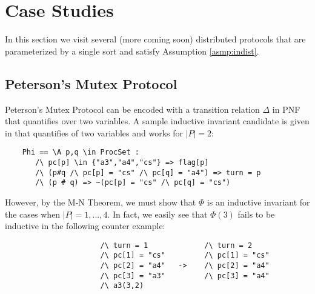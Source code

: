 \documentclass[12pt]{article}
\theoremstyle{definition}
\theoremstyle{remark}
\begin{document}
\section{Case Studies}
In this section we visit several (more coming soon) distributed protocols that are parameterized by a single sort and satisfy Assumption \ref{asmp:indist}.

\subsection{Peterson's Mutex Protocol}
Peterson's Mutex Protocol can be encoded with a transition relation $\Delta$ in PNF that quantifies over two variables.  A sample inductive invariant candidate is given in \cite{ian-peterson} that quantifies of two variables and works for $|P|=2$:
\begin{verbatim}
    Phi == \A p,q \in ProcSet :
       /\ pc[p] \in {"a3","a4","cs"} => flag[p]
       /\ (p#q /\ pc[p] = "cs" /\ pc[q] = "a4") => turn = p
       /\ (p # q) => ~(pc[p] = "cs" /\ pc[q] = "cs")
\end{verbatim}
However, by the M-N Theorem, we must show that $\Phi$ is an inductive invariant for the cases when $|P|=1,...,4$.  In fact, we easily see that $\Phi(3)$ fails to be inductive in the following counter example:
\begin{verbatim}
                      /\ turn = 1             /\ turn = 2
                      /\ pc[1] = "cs"         /\ pc[1] = "cs"
                      /\ pc[2] = "a4"   ->    /\ pc[2] = "a4"
                      /\ pc[3] = "a3"         /\ pc[3] = "a4"
                      /\ a3(3,2)
\end{verbatim}




\end{document}
